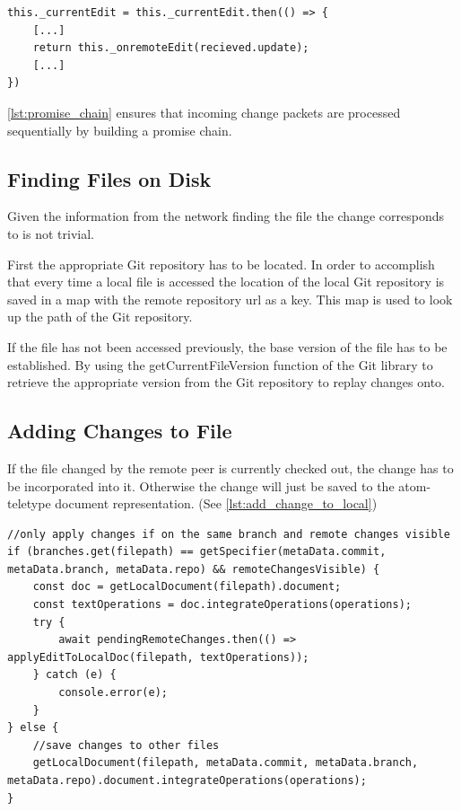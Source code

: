 \begin{lstlisting}[label={lst:promise_chain}, caption=Network Promise Chain]
this._currentEdit = this._currentEdit.then(() => {
    [...]
    return this._onremoteEdit(recieved.update);
    [...]
})
\end{lstlisting}

\ref{lst:promise_chain} ensures that incoming change packets are processed sequentially by building a promise chain.

\subsection{Finding Files on Disk}

Given the information from the network finding the file the change corresponds to is not trivial.

First the appropriate Git repository has to be located.
In order to accomplish that every time a local file is accessed the location of the local Git repository is saved in a map with the remote repository url as a key. This map is used to look up the path of the Git repository. 

If the file has not been accessed previously, the base version of the file has to be established.
By using the getCurrentFileVersion function of the Git library to retrieve the appropriate version from the Git repository to replay changes onto.

\subsection{Adding Changes to File}

If the file changed by the remote peer is currently checked out, the change has to be incorporated into it. Otherwise the change will just be saved to the atom-teletype document representation. (See \ref{lst:add_change_to_local})

\begin{lstlisting}[label={lst:add_change_to_local}, caption=Adding Change to Local Document]
//only apply changes if on the same branch and remote changes visible
if (branches.get(filepath) == getSpecifier(metaData.commit, metaData.branch, metaData.repo) && remoteChangesVisible) {
    const doc = getLocalDocument(filepath).document;
    const textOperations = doc.integrateOperations(operations);
    try {
        await pendingRemoteChanges.then(() => applyEditToLocalDoc(filepath, textOperations));
    } catch (e) {
        console.error(e);
    }
} else {
    //save changes to other files
    getLocalDocument(filepath, metaData.commit, metaData.branch, metaData.repo).document.integrateOperations(operations);
}
\end{lstlisting}